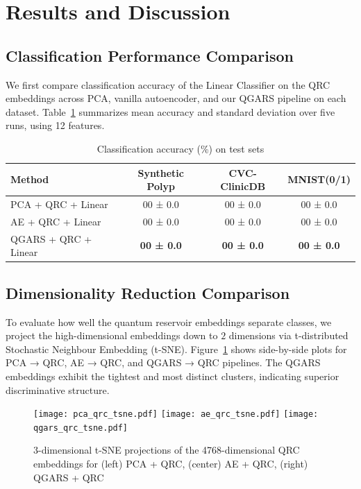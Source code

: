 \documentclass[conference]{IEEEtran}
\begin{document}
\section{Results and Discussion}

\subsection{Classification Performance Comparison}
We first compare classification accuracy of the Linear Classifier on the QRC embeddings across PCA,
vanilla autoencoder, and our QGARS pipeline on each dataset. 
Table~\ref{tab:qrc_reduction_accuracy} summarizes mean accuracy and standard deviation over 
five runs, using 12 features.

\begin{table}[!htb]
  \caption{Classification accuracy (\%) on test sets}
  \label{tab:qrc_reduction_accuracy}
  \centering
  \begin{tabular}{lccc}
    \hline
    Method & Synthetic Polyp & CVC-ClinicDB & MNIST(0/1) \\
    \hline
    PCA + QRC + Linear      &  00 ± 0.0  &  00 ± 0.0  &  00 ± 0.0 \\
    AE + QRC + Linear       &  00 ± 0.0  &  00 ± 0.0  &  00 ± 0.0 \\
    QGARS + QRC + Linear    &  \textbf{00 ± 0.0} &  \textbf{00 ± 0.0} &  \textbf{00 ± 0.0} \\
    \hline
  \end{tabular}
\end{table}


\subsection{Dimensionality Reduction Comparison}

To evaluate how well the quantum reservoir embeddings separate classes, we project the high-dimensional embeddings down to $2$ dimensions via t-distributed Stochastic Neighbour Embedding (t-SNE). Figure~\ref{fig:embeddings_tsne} shows side-by-side plots for PCA → QRC, AE → QRC, and QGARS → QRC pipelines. The QGARS embeddings exhibit the tightest and most distinct clusters, indicating superior discriminative structure.

\begin{figure}[ht]
  \centering
  \texttt{[image: pca\_qrc\_tsne.pdf]}
  \texttt{[image: ae\_qrc\_tsne.pdf]}
  \texttt{[image: qgars\_qrc\_tsne.pdf]}
  \caption{3-dimensional t-SNE projections of the 4768-dimensional QRC embeddings for (left) PCA + QRC, (center) AE + QRC, (right) QGARS + QRC}
  \label{fig:embeddings_tsne}
\end{figure}
\end{document}
